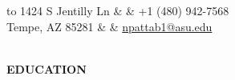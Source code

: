 \documentclass[11pt,a3]{article}
\def\hrulefill{\leavevmode\leaders\hrule height 1pt\hfill\kern 0pt}		%
\begin{document}
{\selectfont	
	\renewcommand{\familydefault}{\sfdefault}

	\noindent
	\begin{tabu} to \textwidth {X[l] X[c] X[r]}
		1424 S Jentilly Ln  &    &  +1 (480) 942-7568 		\\
		Tempe, AZ 85281 &	&   \textcolor{blue} {\href{mailto:npattab1@asu.edu}{npattab1@asu.edu}}	\\
		  \\
	\end{tabu}

	

	\vspace{-2mm}

		
		
		
	



	
	\begin{flushleft}
	{\Large \textbf{EDUCATION}} %
		

\end{flushleft}}
\end{document}
